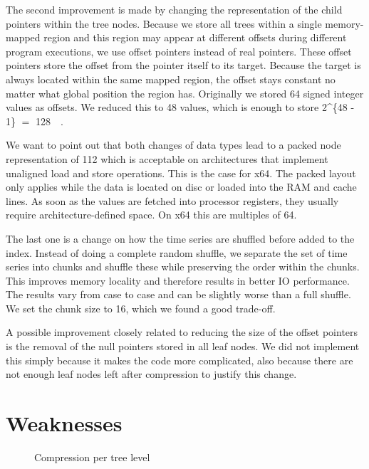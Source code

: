 The second improvement is made by changing the representation of the child pointers within the tree nodes. Because we store all trees within a single memory-mapped region and this region may appear at different offsets during different program executions, we use offset pointers instead of real pointers. These offset pointers store the offset from the pointer itself to its target. Because the target is always located within the same mapped region, the offset stays constant no matter what global position the region has. Originally we stored \SI{64}{\bit} signed integer values as offsets. We reduced this to \SI{48}{\bit} values, which is enough to store \SI[parse-numbers = false]{2^{48 - 1}}{\byte} $=$ \SI{128}{\tera\byte}.

We want to point out that both changes of data types lead to a packed node representation of \SI{112}{\bit} which is acceptable on architectures that implement unaligned load and store operations. This is the case for x64. The packed layout only applies while the data is located on disc or loaded into the RAM and cache lines. As soon as the values are fetched into processor registers, they usually require architecture-defined space. On x64 this are multiples of \SI{64}{\bit}.

The last one is a change on how the time series are shuffled before added to the index. Instead of doing a complete random shuffle, we separate the set of time series into chunks and shuffle these while preserving the order within the chunks. This improves memory locality and therefore results in better IO performance. The results vary from case to case and can be slightly worse than a full shuffle. We set the chunk size to \num{16}, which we found a good trade-off.

A possible improvement closely related to reducing the size of the offset pointers is the removal of the null pointers stored in all leaf nodes. We did not implement this simply because it makes the code more complicated, also because there are not enough leaf nodes left after compression to justify this change.



\section{Weaknesses}
\label{sec:algorithm:weak}

\begin{figure}
    \centering
    
    \caption{Compression per tree level}\label{fig:weakness}
\end{figure}

